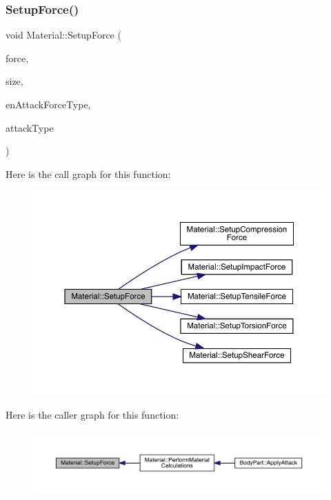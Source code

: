 \subsubsection{\texorpdfstring{Setup\+Force()}{SetupForce()}}
{\footnotesize\ttfamily void Material\+::\+Setup\+Force (\begin{DoxyParamCaption}\item[{float}]{force,  }\item[{float}]{size,  }\item[{\mbox{\hyperlink{_enum_types_8hpp_ad893f9959c49f07fb713f13630b7ee2d}{Attack\+Force\+Type}}}]{en\+Attack\+Force\+Type,  }\item[{\mbox{\hyperlink{_enum_types_8hpp_a904b2f9c8f3951116c343784c59d6afe}{Attack\+Type}}}]{attack\+Type }\end{DoxyParamCaption})\hspace{0.3cm}{\ttfamily [private]}}

Here is the call graph for this function\+:
\nopagebreak
\begin{figure}[H]
\begin{center}
\leavevmode
\includegraphics[width=350pt]{dc/dee/class_material_aa2951eaa13d1f8137cc228ccc9b0c33c_cgraph}
\end{center}
\end{figure}
Here is the caller graph for this function\+:
\nopagebreak
\begin{figure}[H]
\begin{center}
\leavevmode
\includegraphics[width=350pt]{dc/dee/class_material_aa2951eaa13d1f8137cc228ccc9b0c33c_icgraph}
\end{center}
\end{figure}
\mbox{\label{class_material_a0306582d701642b867f9c53c769ffaf7}} 
